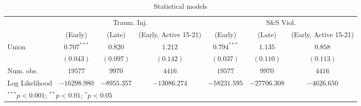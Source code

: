 
\begin{table}
\begin{center}
\begin{tabular}{l c c c c c c}
\hline
 & \multicolumn{3}{c}{Traum. Inj.} & \multicolumn{3}{c}{S\&S Viol.} \\
\cline{2-4} \cline{5-7}
 & (Early) & (Late) & (Early, Active 15-21) & (Early) & (Late) & (Early, Active 15-21) \\
\hline
Union          & $0.707^{***}$ & $0.820$     & $1.212$      & $0.794^{***}$ & $1.135$      & $0.858$     \\
               & $(0.043)$     & $(0.097)$   & $(0.142)$    & $(0.037)$     & $(0.110)$    & $(0.113)$   \\
\hline
Num. obs.      & $19577$       & $9970$      & $4416$       & $19577$       & $9970$       & $4416$      \\
Log Likelihood & $-16298.980$  & $-8955.357$ & $-13086.274$ & $-58231.595$  & $-27706.308$ & $-4626.650$ \\
\hline
\multicolumn{7}{l}{\scriptsize{$^{***}p<0.001$; $^{**}p<0.01$; $^{*}p<0.05$}}
\end{tabular}
\caption{Statistical models}
\label{table:coefficients}
\end{center}
\end{table}

